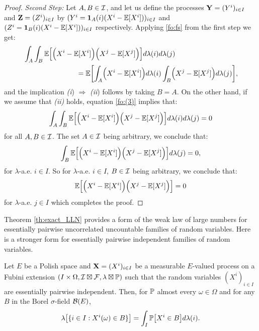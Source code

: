 \begin{proof}
	
	\vskip 2pt\noindent
	\emph{Second Step: }
	Let $A,B\in {\cal I}$, and let us define the processes $\mathbf{Y}=(Y^i)_{i\in I}$ and  $\mathbf{Z}=(Z^i)_{i\in I}$  by 
	$(Y^i={\mathbf 1}_A(i)(X^i-\mathbb{E}[X^i]))_{i \in I}$ and 
	$(Z^i={\mathbf 1}_B(i)(X^i-\mathbb{E}[X^i]))_{i \in I}$ respectively. Applying \eqref{fo:fs} from the first step we get:
	\begin{equation}
	\label{fo:(3)}
	\begin{split}
	&\int_A\int_B\mathbb{E}\Bigl[\Bigl(X^i-\mathbb{E}[X^i]\Bigr)\Bigl(X^j-\mathbb{E}[X^j]\Bigr)\Bigr]d\lambda(i)d\lambda(j)\\
	&\hskip 75pt
	=\mathbb{E}\biggl[\int_A\Bigl(X^i-\mathbb{E}[X^i]\Bigr)d\lambda(i)\int_B\Bigl(X^j-\mathbb{E}[X^j]\Bigr) d\lambda(j)\biggr],
	\end{split}
	\end{equation}
	and the implication 
	\textit{(i})
	$\Rightarrow$ 
	\textit{(ii})
	follows by taking $B=A$. On the other hand, if we assume that \textit{(ii)} holds, equation \eqref{fo:(3)} implies that:
	$$
	\int_A\int_B\mathbb{E}\Bigl[\Bigl(X^i-\mathbb{E}[X^i]\Bigr)\Bigl(X^j-\mathbb{E}[X^j]\Bigr)\Bigr]d\lambda(i)d\lambda(j)=0
	$$
	for all $A,B\in {\cal I}$. The set $A\in {\cal I}$ being arbitrary, we conclude that: 
	$$
	\int_B\mathbb{E}\Bigl[\Bigl(X^i-\mathbb{E}[X^i]\Bigr)\Bigl(X^j-\mathbb{E}[X^j]\Bigr)\Bigr]d\lambda(j)=0,
	$$
	for $\lambda$-a.e. $i\in I$.  So for $\lambda$-a.e. $i\in I$, $B\in{\cal I}$ being arbitrary, we conclude that: 
	$$
	\mathbb{E}\Bigl[\Bigl(X^i-\mathbb{E}[X^i]\Bigr)\Bigl(X^j-\mathbb{E}[X^j]\Bigr)\Bigr]=0
	$$ 
	for $\lambda$-a.e. $j\in I$ which completes the proof.
\end{proof}
\vskip 2pt

Theorem \ref{th:exact_LLN} provides a form of the weak law of large numbers for essentially pairwise uncorrelated uncountable families of random variables. Here is a stronger form for 
essentially pairwise independent families of random variables.

\begin{theorem}
	\label{re:exact_LLN}
	Let $E$ be a Polish space and $\mathbf{X}=(X^i)_{i\in I}$ be a measurable
	$E$-valued process on a Fubini extension $(I\times\Omega,{\cal I}\boxtimes{\cal F},\lambda\boxtimes\mathbb{P})$
	such that the random variables $(X^i)_{i\in I}$ are essentially pairwise independent. Then, for $\mathbb{P}$ almost every $\omega \in \Omega$ and for any $B$ in the Borel $\sigma$-field ${\cal B}(E)$, 
	\begin{equation*}
	\lambda \bigl[ \{ i \in I : X^i(\omega) \in B \} \bigr] 
	= \int_{I}
	\mathbb{P} \bigl[ X^i \in B\bigr] d \lambda (i).
	\end{equation*}
\end{theorem}

